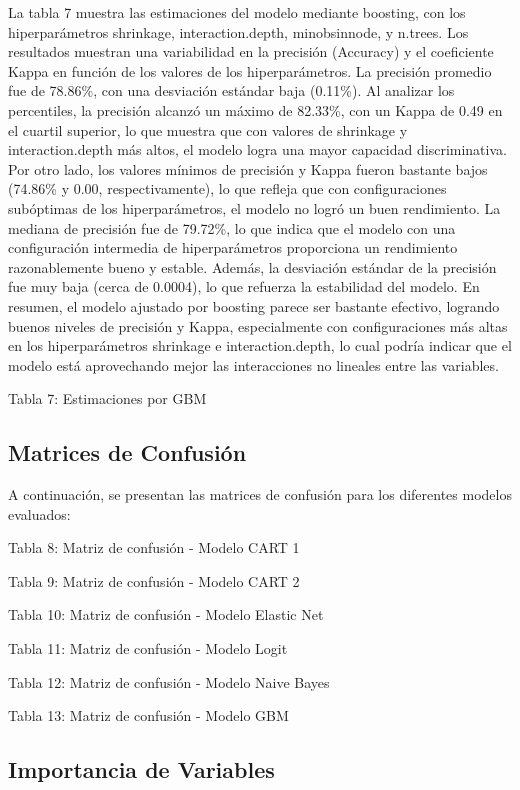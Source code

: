 \documentclass[12pt,a4paper,onecolumn]{article}
\begin{document}
La tabla 7 muestra las estimaciones del modelo mediante boosting, con los hiperparámetros shrinkage, interaction.depth, minobsinnode, y n.trees. Los resultados muestran una variabilidad en la precisión (Accuracy) y el coeficiente Kappa en función de los valores de los hiperparámetros. La precisión promedio fue de 78.86\%, con una desviación estándar baja (0.11\%). Al analizar los percentiles, la precisión alcanzó un máximo de 82.33\%, con un Kappa de 0.49 en el cuartil superior, lo que muestra que con valores de shrinkage y interaction.depth más altos, el modelo logra una mayor capacidad discriminativa. Por otro lado, los valores mínimos de precisión y Kappa fueron bastante bajos (74.86\% y 0.00, respectivamente), lo que refleja que con configuraciones subóptimas de los hiperparámetros, el modelo no logró un buen rendimiento. La mediana de precisión fue de 79.72\%, lo que indica que el modelo con una configuración intermedia de hiperparámetros proporciona un rendimiento razonablemente bueno y estable. Además, la desviación estándar de la precisión fue muy baja (cerca de 0.0004), lo que refuerza la estabilidad del modelo. En resumen, el modelo ajustado por boosting parece ser bastante efectivo, logrando buenos niveles de precisión y Kappa, especialmente con configuraciones más altas en los hiperparámetros shrinkage e interaction.depth, lo cual podría indicar que el modelo está aprovechando mejor las interacciones no lineales entre las variables.

{\color{blue} Tabla 7: Estimaciones por GBM}

\subsection{Matrices de Confusión}

A continuación, se presentan las matrices de confusión para los diferentes modelos evaluados:

{\color{blue} Tabla 8: Matriz de confusión - Modelo CART 1}

{\color{blue} Tabla 9: Matriz de confusión - Modelo CART 2}

{\color{blue} Tabla 10: Matriz de confusión - Modelo Elastic Net}

{\color{blue} Tabla 11: Matriz de confusión - Modelo Logit}

{\color{blue} Tabla 12: Matriz de confusión - Modelo Naive Bayes}

{\color{blue} Tabla 13: Matriz de confusión - Modelo GBM}

\subsection{Importancia de Variables}
\end{document}
